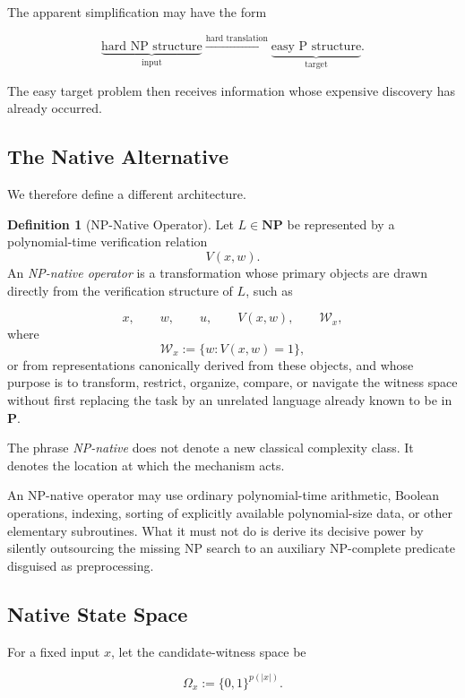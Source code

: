 \documentclass[11pt]{article}
\theoremstyle{plain}
\theoremstyle{definition}
\newtheorem{definition}[theorem]{Definition}
\begin{document}
The apparent simplification may have the form

\[
    \underbrace{\text{hard NP structure}}_{\text{input}}
    \xrightarrow{
        \text{hard translation}
    }
    \underbrace{\text{easy P structure}}_{\text{target}}.
\]

The easy target problem then receives information whose expensive discovery
has already occurred.

\subsection{The Native Alternative}

We therefore define a different architecture.

\begin{definition}[NP-Native Operator]
\label{def:np-native-operator}
Let \(L\in\mathbf{NP}\) be represented by a polynomial-time verification
relation
\[
    V(x,w).
\]
An \emph{NP-native operator} is a transformation whose primary objects are
drawn directly from the verification structure of \(L\), such as

\[
    x,\qquad
    w,\qquad
    u,\qquad
    V(x,w),\qquad
    \mathcal{W}_x,
\]
where
\[
    \mathcal{W}_x
    :=
    \{w:V(x,w)=1\},
\]
or from representations canonically derived from these objects, and whose
purpose is to transform, restrict, organize, compare, or navigate the witness
space without first replacing the task by an unrelated language already
known to be in \(\mathbf{P}\).
\end{definition}

The phrase \emph{NP-native} does not denote a new classical complexity class.
It denotes the location at which the mechanism acts.

An NP-native operator may use ordinary polynomial-time arithmetic, Boolean
operations, indexing, sorting of explicitly available polynomial-size data,
or other elementary subroutines.  What it must not do is derive its decisive
power by silently outsourcing the missing NP search to an auxiliary
NP-complete predicate disguised as preprocessing.

\subsection{Native State Space}

For a fixed input \(x\), let the candidate-witness space be

\[
    \Omega_x
    :=
    \{0,1\}^{p(|x|)}.
\]
\end{document}
